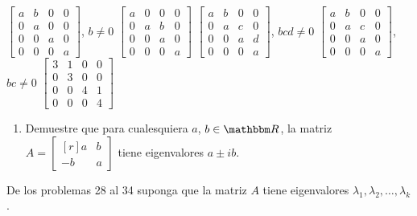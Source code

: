 \begin{tasks}[
    style=enumerate,
    label-offset = 3mm,
    ]
    \task $\begin{bmatrix*}a & b & 0 & 0 \\ 0 & a & 0 & 0 \\ 0 & 0 & a & 0 \\ 0 & 0 & 0 & a\end{bmatrix*}$, $b \neq 0$
    \task $\begin{bmatrix*}a & 0 & 0 & 0 \\ 0 & a & b & 0 \\ 0 & 0 & a & 0 \\ 0 & 0 & 0 & a\end{bmatrix*}$
    \task $\begin{bmatrix*}a & b & 0 & 0 \\ 0 & a & c & 0 \\ 0 & 0 & a & d \\ 0 & 0 & 0 & a\end{bmatrix*}$, $b c d \neq 0$
    \task $\begin{bmatrix*}a & b & 0 & 0 \\ 0 & a & c & 0 \\ 0 & 0 & a & 0 \\ 0 & 0 & 0 & a\end{bmatrix*}$, $b c \neq 0$
    \task $\begin{bmatrix*}3 & 1 & 0 & 0 \\ 0 & 3 & 0 & 0 \\ 0 & 0 & 4 & 1 \\ 0 & 0 & 0 & 4\end{bmatrix*}$
\end{tasks}
\begin{enumerate}[start=27]
    \item Demuestre que para cualesquiera $a$, $b \in \RR$, la matriz $A=\begin{bmatrix*}[r]a & b \\ -b & a\end{bmatrix*}$ tiene eigenvalores $a \pm i b$.
\end{enumerate}
De los problemas 28 al 34 suponga que la matriz $A$ tiene eigenvalores $\lambda_{1}, \lambda_{2}, \dots, \lambda_{k}$.
